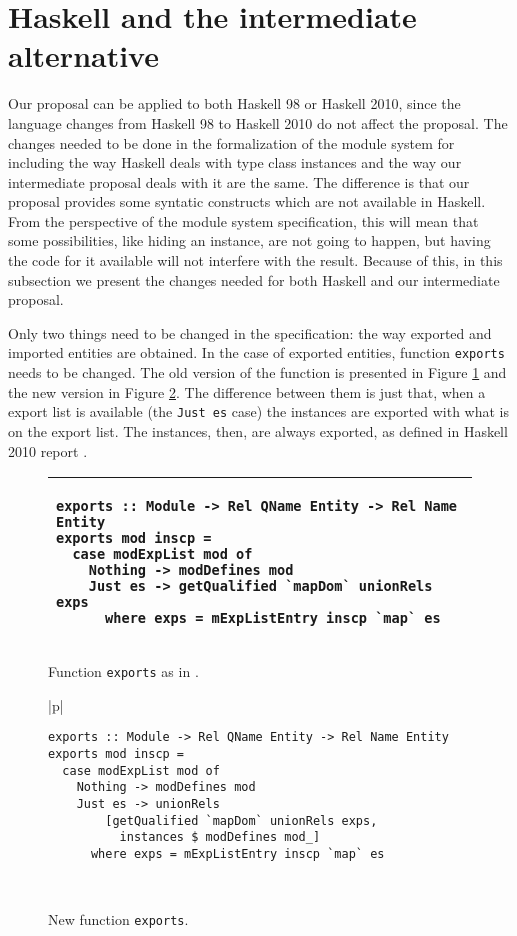 \documentclass[msc]{ppgccufmg}
\begin{document}
\section{Haskell and the intermediate alternative}
Our proposal can be applied to both Haskell 98 or Haskell 2010, since
the language changes from Haskell 98 to Haskell 2010 do not affect the
proposal.  The changes needed to be done in the formalization of the module
system for including the way Haskell deals with type class
instances and the way our intermediate proposal deals with it are the
same.  The difference is that our proposal provides some syntatic
constructs which are not available in Haskell.  From the
perspective of the module system specification, this will mean that
some possibilities, like hiding an instance, are not going to happen,
but having the code for it available will not interfere with the
result.  Because of this, in this subsection we present the changes
needed for both Haskell and our intermediate proposal.

Only two things need to be changed in the specification: the way
exported and imported entities are obtained.  In the case of exported
entities, function \texttt{exports} \citep[section~5.2]{formal} needs
to be changed. The old version of the function is presented in Figure
\ref{old-exports} and the new version in Figure \ref{new-exports}.
The difference between them is just that, when a export list is
available (the \texttt{Just es} case) the instances are exported with
what is on the export list.  The instances, then, are always exported,
as defined in Haskell 2010 report \citep[section 5.4]{report}.

\begin{figure}
\caption{Function \texttt{exports} as in \citep[section 5.2]{formal}.\label{old-exports}}
\begin{tabular}{|p{\textwidth}|}
\hline
\begin{verbatim}
exports :: Module -> Rel QName Entity -> Rel Name Entity
exports mod inscp =
  case modExpList mod of
    Nothing -> modDefines mod
    Just es -> getQualified `mapDom` unionRels exps
      where exps = mExpListEntry inscp `map` es
\end{verbatim}
\\
\hline
\end{tabular}
\end{figure}

\begin{figure}
\caption{New function \texttt{exports}.\label{new-exports}}
\begin{tabular}{|p{\textwidth}|}
\hline
\begin{verbatim}
exports :: Module -> Rel QName Entity -> Rel Name Entity
exports mod inscp =
  case modExpList mod of
    Nothing -> modDefines mod
    Just es -> unionRels
        [getQualified `mapDom` unionRels exps,
          instances $ modDefines mod_]
      where exps = mExpListEntry inscp `map` es
\end{verbatim}
\\
\hline
\end{tabular}
\end{figure}
\end{document}
